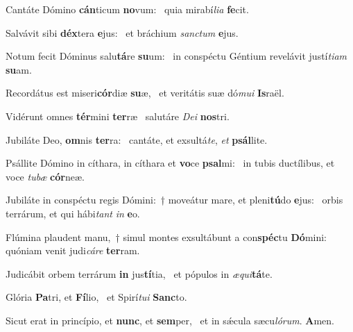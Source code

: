 \item Cantáte Dómino \textbf{cán}ticum \textbf{no}vum:~\psstar{} quia mirabí\textit{lia} \textbf{fe}cit.
\item Salvávit sibi \textbf{déx}tera \textbf{e}jus:~\psstar{} et bráchium \textit{sanctum} \textbf{e}jus.
\item Notum fecit Dóminus salu\textbf{tá}re \textbf{su}um:~\psstar{} in conspéctu Géntium revelávit justí\textit{tiam} \textbf{su}am.
\item Recordátus est miseri\textbf{cór}diæ \textbf{su}æ,~\psstar{} et veritátis suæ dó\textit{mui} \textbf{Is}raël.
\item Vidérunt omnes \textbf{tér}mini \textbf{ter}ræ~\psstar{} salutáre \textit{Dei} \textbf{nos}tri.
\item Jubiláte Deo, \textbf{om}nis \textbf{ter}ra:~\psstar{} cantáte, et exsultá\textit{te}, \textit{et} \textbf{psál}lite.
\item Psállite Dómino in cíthara, in cíthara et \textbf{vo}ce \textbf{psal}mi:~\psstar{} in tubis ductílibus, et voce \textit{tubæ} \textbf{cór}neæ.
\item Jubiláte in conspéctu regis Dómini:~† moveátur mare, et pleni\textbf{tú}do \textbf{e}jus:~\psstar{} orbis terrárum, et qui hábi\textit{tant} \textit{in} \textbf{e}o.
\item Flúmina plaudent manu,~† simul montes exsultábunt a con\textbf{spéc}tu \textbf{Dó}mini:~\psstar{} quóniam venit judi\textit{cáre} \textbf{ter}ram.
\item Judicábit orbem terrárum \textbf{in} jus\textbf{tí}tia,~\psstar{} et pópulos in \textit{æqui}\textbf{tá}te.
\item Glória \textbf{Pa}tri, et \textbf{Fí}lio,~\psstar{} et Spirí\textit{tui} \textbf{Sanc}to.
\item Sicut erat in princípio, et \textbf{nunc}, et \textbf{sem}per,~\psstar{} et in sǽcula sæcu\textit{lórum}. \textbf{A}men.
